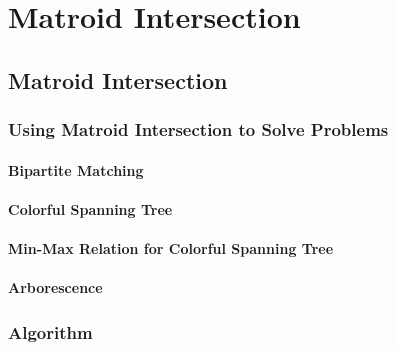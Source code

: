 \chapter{Matroid Intersection}

\section{Matroid Intersection}
\subsection{Using Matroid Intersection to Solve Problems}
\subsubsection{Bipartite Matching}
\subsubsection{Colorful Spanning Tree}
\subsubsection{Min-Max Relation for Colorful Spanning Tree}
\subsubsection{Arborescence}
\subsection{Algorithm}